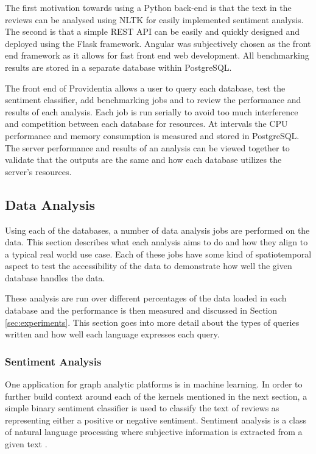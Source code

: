 The first motivation towards using a Python back-end is that the text in the reviews can be analysed using NLTK for easily implemented sentiment analysis. The second is that a simple REST API can be easily and quickly designed and deployed using the Flask framework. Angular was subjectively chosen as the front end framework as it allows for fast front end web development. All benchmarking results are stored in a separate database within PostgreSQL.

The front end of Providentia allows a user to query each database, test the sentiment classifier, add benchmarking jobs and to review the performance and results of each analysis. Each job is run serially to avoid too much interference and competition between each database for resources. At intervals the CPU performance and memory consumption is measured and stored in PostgreSQL. The server performance and results of an analysis can be viewed together to validate that the outputs are the same and how each database utilizes the server's resources.

\subsection{Data Analysis}
Using each of the databases, a number of data analysis jobs are performed on the data. This section describes what each analysis aims to do and how they align to a typical real world use case. Each of these jobs have some kind of spatiotemporal aspect to test the accessibility of the data to demonstrate how well the given database handles the data.

These analysis are run over different percentages of the data loaded in each database and the performance is then measured and discussed in Section \ref{sec:experiments}. This section goes into more detail about the types of queries written and how well each language expresses each
query.

\subsubsection{Sentiment Analysis}
One application for graph analytic platforms is in machine learning. In order to further build context around each of the kernels mentioned in the next section, a simple binary sentiment classifier is used to classify the text of reviews as representing either a positive or negative sentiment. Sentiment analysis is a class of natural language processing where subjective information is extracted from a given text \cite{sentimentAnalysisGupta}.

